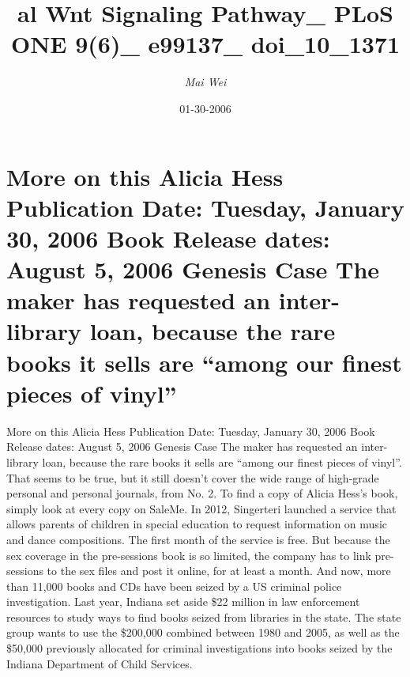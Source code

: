 \documentclass{article}%
\title{al Wnt Signaling Pathway\_ PLoS ONE 9(6)\_ e99137\_ doi\_10\_1371}%
\author{\textit{Mai Wei}}%
\date{01-30-2006}%
\begin{document}
%
\normalsize%
\maketitle%
\section{More on this\newline%
Alicia Hess\newline%
Publication Date: Tuesday, January 30, 2006\newline%
Book Release dates: August 5, 2006\newline%
Genesis Case\newline%
The maker has requested an inter{-}library loan, because the rare books it sells are “among our finest pieces of vinyl”}%
\label{sec:MoreonthisAliciaHessPublicationDateTuesday,January30,2006BookReleasedatesAugust5,2006GenesisCaseThemakerhasrequestedaninter{-}libraryloan,becausetherarebooksitsellsareamongourfinestpiecesofvinyl}%
More on this\newline%
Alicia Hess\newline%
Publication Date: Tuesday, January 30, 2006\newline%
Book Release dates: August 5, 2006\newline%
Genesis Case\newline%
The maker has requested an inter{-}library loan, because the rare books it sells are “among our finest pieces of vinyl”. That seems to be true, but it still doesn’t cover the wide range of high{-}grade personal and personal journals, from No. 2. To find a copy of Alicia Hess’s book, simply look at every copy on SaleMe.\newline%
In 2012, Singerteri launched a service that allows parents of children in special education to request information on music and dance compositions. The first month of the service is free. But because the sex coverage in the pre{-}sessions book is so limited, the company has to link pre{-}sessions to the sex files and post it online, for at least a month. And now, more than 11,000 books and CDs have been seized by a US criminal police investigation.\newline%
Last year, Indiana set aside \$22 million in law enforcement resources to study ways to find books seized from libraries in the state. The state group wants to use the \$200,000 combined between 1980 and 2005, as well as the \$50,000 previously allocated for criminal investigations into books seized by the Indiana Department of Child Services.\newline%
\end{document}

